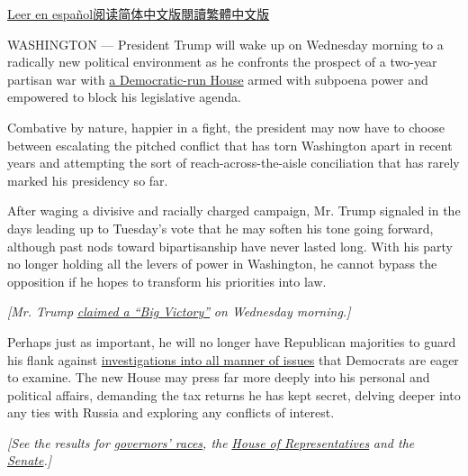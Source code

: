 \href{https://www.nytimes.com/es/2018/11/07/elecciones-2018-trump-democratas}{Leer
en
español}\href{https://cn.nytimes.com/usa/20181108/trump-house-midterm-election/}{阅读简体中文版}\href{https://cn.nytimes.com/usa/20181108/trump-house-midterm-election/zh-hant/}{閱讀繁體中文版}

WASHINGTON --- President Trump will wake up on Wednesday morning to a
radically new political environment as he confronts the prospect of a
two-year partisan war with
\href{https://www.nytimes.com/2018/11/06/us/politics/midterm-elections-results.html}{a
Democratic-run House} armed with subpoena power and empowered to block
his legislative agenda.

Combative by nature, happier in a fight, the president may now have to
choose between escalating the pitched conflict that has torn Washington
apart in recent years and attempting the sort of reach-across-the-aisle
conciliation that has rarely marked his presidency so far.

After waging a divisive and racially charged campaign, Mr. Trump
signaled in the days leading up to Tuesday's vote that he may soften his
tone going forward, although past nods toward bipartisanship have never
lasted long. With his party no longer holding all the levers of power in
Washington, he cannot bypass the opposition if he hopes to transform his
priorities into law.

\emph{{[}Mr. Trump}
\href{https://www.nytimes.com/2018/11/07/us/politics/trump-midterms-house-senate.html}{\emph{claimed
a ``Big Victory''}} \emph{on Wednesday morning.{]}}

Perhaps just as important, he will no longer have Republican majorities
to guard his flank against
\href{https://www.nytimes.com/2018/09/03/us/politics/democrats-trump-impeachment.html}{investigations
into all manner of issues} that Democrats are eager to examine. The new
House may press far more deeply into his personal and political affairs,
demanding the tax returns he has kept secret, delving deeper into any
ties with Russia and exploring any conflicts of interest.

\emph{{[}See the results for}
\emph{\href{https://www.nytimes.com/interactive/2018/11/06/us/elections/results-governor-elections.html?action=click\&module=Intentional\&pgtype=Article}{governors'
races}, the}
\emph{\href{https://www.nytimes.com/interactive/2018/11/06/us/elections/results-house-elections.html?action=click\&module=Spotlight\&pgtype=Homepage}{House
of Representatives}} \emph{and the}
\emph{\href{https://www.nytimes.com/interactive/2018/11/06/us/elections/results-senate-elections.html}{Senate}.{]}}

